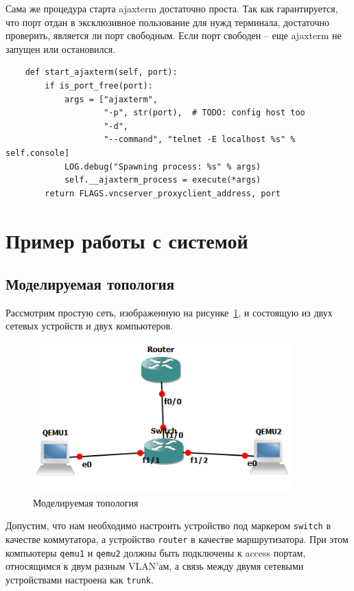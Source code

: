 Сама же процедура старта ajaxterm достаточно проста. Так как гарантируется, что порт
отдан в эксклюзивное пользование для нужд терминала, достаточно проверить, является 
ли порт свободным. Если порт свободен -- еще ajaxterm не запущен или остановился.
\begin{lstlisting}
    def start_ajaxterm(self, port):
        if is_port_free(port):
            args = ["ajaxterm",
                    "-p", str(port),  # TODO: config host too
                    "-d",
                    "--command", "telnet -E localhost %s" % self.console]
            LOG.debug("Spawning process: %s" % args)
            self.__ajaxterm_process = execute(*args)
        return FLAGS.vncserver_proxyclient_address, port
\end{lstlisting}



\section{Пример работы с системой}

\subsection{Моделируемая топология}

Рассмотрим простую сеть, изображенную на рисунке~\ref{fig:topology-vlan}, и состоящую из двух сетевых устройств и двух компьютеров.
\begin{figure}
  \centering
  \includegraphics[width=10cm]{fig/topology-vlan.png}
  \caption{Моделируемая топология}
  \label{fig:topology-vlan}
\end{figure}
Допустим, что нам необходимо настроить устройство под маркером \verb`switch` в качестве коммутатора, а устройство
\verb`router` в качестве маршрутизатора. При этом компьютеры \verb`qemu1` и \verb`qemu2` должны быть подключены
к access портам, относящимся к двум разным VLAN'ам, а связь между двумя сетевыми устройствами настроена как \verb`trunk`.

